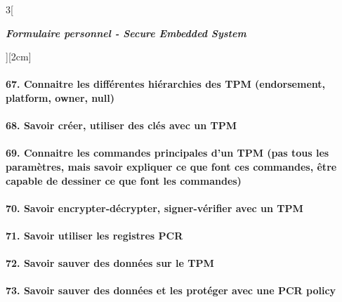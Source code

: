 \begin{multicols}{3}[\centerline{ \large\em \textbf{Formulaire personnel - Secure Embedded System}}][2cm]
\paragraph*{67. Connaitre les différentes hiérarchies des TPM (endorsement, platform, owner, null)\\}
\paragraph*{68. Savoir créer, utiliser des clés avec un TPM\\}
\paragraph*{69. Connaitre les commandes principales d’un TPM (pas tous les paramètres, mais savoir expliquer ce que font ces commandes, être capable de dessiner ce que font les
commandes)\\}
\paragraph*{70. Savoir encrypter-décrypter, signer-vérifier avec un TPM\\}
\paragraph*{71. Savoir utiliser les registres PCR\\}
\paragraph*{72. Savoir sauver des données sur le TPM\\}
\paragraph*{73. Savoir sauver des données et les protéger avec une PCR policy\\}
\begin{minipage}{\linewidth}
	\centering
\end{minipage}\\

\end{multicols}